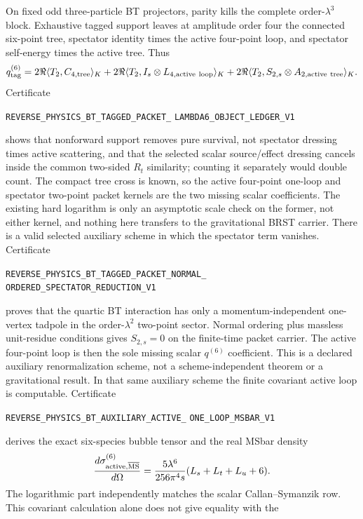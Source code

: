 \documentclass[11pt]{article}
\theoremstyle{definition}
\theoremstyle{remark}
\begin{document}
On fixed odd three-particle BT projectors, parity kills the complete
order-$\lambda^3$ block.  Exhaustive tagged support leaves at amplitude order
four the connected six-point tree, spectator identity times the active
four-point loop, and spectator self-energy times the active tree.  Thus
\[
 q_{\rm tag}^{(6)}=2\Re\langle T_2,C_{4,\rm tree}\rangle_K
 +2\Re\langle T_2,I_s\otimes L_{4,\rm active\ loop}\rangle_K
 +2\Re\langle T_2,S_{2,s}\otimes A_{2,\rm active\ tree}\rangle_K.
\]
Certificate
\par\noindent
\texttt{REVERSE\_PHYSICS\_BT\_TAGGED\_PACKET\_}
\allowbreak\texttt{LAMBDA6\_OBJECT\_LEDGER\_V1}
\par\noindent
shows that nonforward support removes pure survival, not spectator dressing
times active scattering, and that the selected scalar
source/effect dressing cancels inside the common two-sided $R_t$ similarity;
counting it separately would double count.  The compact tree cross is known,
so the active four-point one-loop and spectator two-point packet kernels are
the two missing scalar coefficients.  The existing hard logarithm is only an
asymptotic scale check on the former, not either kernel, and nothing here
transfers to the gravitational BRST carrier.
There is a valid selected auxiliary scheme in which the spectator term
vanishes.  Certificate
\par\noindent
\texttt{REVERSE\_PHYSICS\_BT\_TAGGED\_PACKET\_NORMAL\_}
\allowbreak\texttt{ORDERED\_SPECTATOR\_REDUCTION\_V1}
\par\noindent
proves that the quartic BT interaction has only a momentum-independent
one-vertex tadpole in the order-$\lambda^2$ two-point sector.  Normal ordering
plus massless unit-residue conditions gives $S_{2,s}=0$ on the finite-time
packet carrier.  The active four-point loop is then the sole missing scalar
$q^{(6)}$ coefficient.  This is a declared auxiliary renormalization scheme,
not a scheme-independent theorem or a gravitational result.
In that same auxiliary scheme the finite covariant active loop is computable.
Certificate
\par\noindent
\texttt{REVERSE\_PHYSICS\_BT\_AUXILIARY\_ACTIVE\_}
\allowbreak\texttt{ONE\_LOOP\_MSBAR\_V1}
\par\noindent
derives the exact six-species bubble tensor and the real MSbar density
\[
 {d\sigma_{\rm active,\overline{MS}}^{(6)}\over d\Omega}
 ={5\lambda^6\over256\pi^4s}(L_s+L_t+L_u+6).
\]
The logarithmic part independently matches the scalar Callan--Symanzik row.
This covariant calculation alone does not give equality with the
\end{document}
